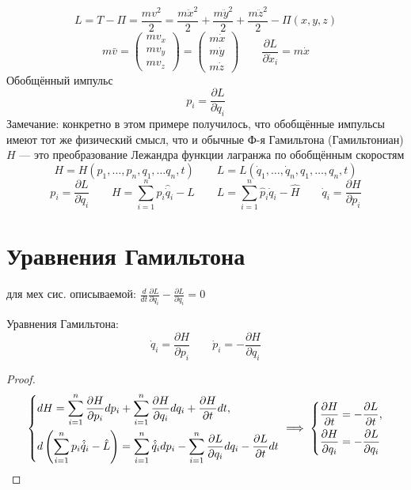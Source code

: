 \documentclass[crop=false]{standalone}
\begin{document}
\keypoint \[L = T - \Pi = \frac{mv^2}{2} = \frac{m \ddot x^2}{2} + \frac{m \ddot y^2}{2} + \frac{m \ddot z^2}{2} - \Pi(x,y,z)\]
\[m \bar v = \begin{pmatrix}
    m v_x \\ m v_y \\ m v_z
\end{pmatrix} = \begin{pmatrix}
    m \dot x  \\ m \dot y \\ m \dot z
\end{pmatrix}\qquad \frac{\partial L}{\partial \dot x_i} = m \dot x\]
\Def Обобщённый импульс 
\[p_i  = \frac{\partial L}{\partial \dot q_i}\]
Замечание: конкретно в этом примере получилось, что обобщённые импульсы имеют тот же физический смысл, что и обычные
\Def Ф-я Гамильтона (Гамильтониан)$H$ — это преобразование Лежандра функции лагранжа по обобщённым скоростям
\[H = H(p_1, \dots, p_n, q_1, \dots q_n, t) \qquad L = L(\dot q_1, \dots, \dot q_n, q_1, \dots, q_n , t)\]
\[p_i = \frac{\partial L}{\partial \dot q_i} \qquad  H = \sum_{i=1}^{n} p_i \hat{\dot q}_i - \hat L \qquad L = \sum_{i=1}^{n} \hat p_i \dot q_i - \hat H \qquad \dot q_i = \frac{\partial H}{\partial p_i}\]
\section{Уравнения Гамильтона}
\noindent \keypoint
для мех сис. описываемой:
    $\frac{d }{d t} \frac{\partial L}{\partial \dot q_i} - \frac{\partial L}{\partial q_i} = 0$

Уравнения Гамильтона:
\[\dot q_i = \frac{\partial H}{\partial p_i} \qquad \dot p_i = -\frac{\partial H}{\partial q_i}\]
\begin{proof}
    \[
    \begin{dcases}
        d H = \sum_{i=1}^{n} \frac{\partial H}{\partial p_i} d p_i + \sum_{i=1}^{n} \frac{\partial H}{\partial q_i} d q_i + \frac{\partial H}{\partial t} d t, \\
        d \left( \sum_{i=1}^{n} p_i \hat {\dot q}_i - \hat L\right) = \sum_{i=1}^{n} \hat{\dot q}_i d p_i - \sum_{i=1}^{n} \frac{\partial L}{\partial q_i} d q_i - \frac{\partial L}{\partial t} d t
    \end{dcases} 
    \implies
    \begin{dcases} 
        \frac{\partial H}{\partial t} = - \frac{\partial L}{\partial t}, \\
        \frac{\partial H}{\partial q_i} = - \frac{\partial L}{\partial q_i}
    \end{dcases}
        \]
\end{proof}
\end{document}
